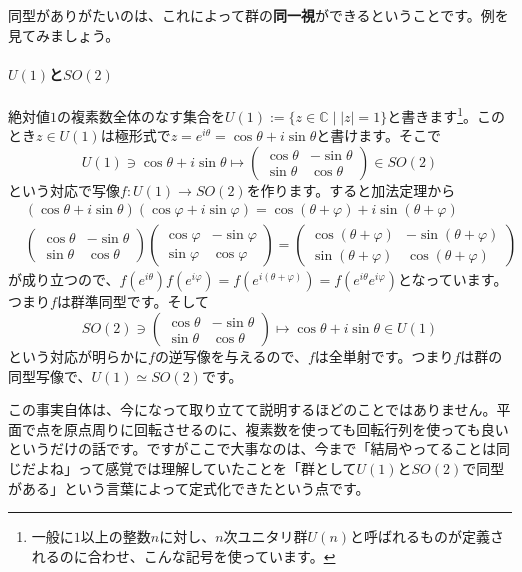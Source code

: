 同型がありがたいのは、これによって群の\textbf{同一視}ができるということです。例を見てみましょう。

\paragraph{$U(1)$と$SO(2)$} 絶対値$1$の複素数全体のなす集合を$U(1) := \{ z \in \mathbb{C} \mid |z| = 1 \} $と書きます\footnote{一般に$1$以上の整数$n$に対し、$n$次ユニタリ群$U(n)$と呼ばれるものが定義されるのに合わせ、こんな記号を使っています。}。このとき$z \in U(1)$は極形式で$z = e^{i\theta} = \cos\theta + i \sin\theta$と書けます。そこで
\[
U(1) \ni \cos\theta + i \sin\theta \mapsto
\begin{pmatrix}
\cos\theta & -\sin\theta \\
\sin\theta & \cos\theta
\end{pmatrix}
\in SO(2)
\]
という対応で写像$f \colon U(1) \rightarrow SO(2)$を作ります。すると加法定理から
\begin{align*}
&(\cos\theta + i \sin\theta)(\cos\varphi + i \sin\varphi)
= \cos(\theta + \varphi) + i \sin(\theta + \varphi) \\
&\begin{pmatrix}
\cos\theta & -\sin\theta \\
\sin\theta & \cos\theta
\end{pmatrix}
\begin{pmatrix}
\cos\varphi & -\sin\varphi \\
\sin\varphi & \cos\varphi
\end{pmatrix}
=
\begin{pmatrix}
\cos(\theta + \varphi) & -\sin(\theta + \varphi) \\
\sin(\theta + \varphi) & \cos(\theta + \varphi)
\end{pmatrix}
\end{align*}
が成り立つので、$f(e^{i\theta}) f(e^{i\varphi}) = f(e^{i(\theta + \varphi)}) = f(e^{i\theta} e^{i\varphi})$となっています。つまり$f$は群準同型です。そして
\[
SO(2) \ni
\begin{pmatrix}
\cos\theta & -\sin\theta \\
\sin\theta & \cos\theta
\end{pmatrix}
\mapsto
\cos\theta + i \sin\theta
\in U(1)
\]
という対応が明らかに$f$の逆写像を与えるので、$f$は全単射です。つまり$f$は群の同型写像で、$U(1) \simeq SO(2)$です。

この事実自体は、今になって取り立てて説明するほどのことではありません。平面で点を原点周りに回転させるのに、複素数を使っても回転行列を使っても良いというだけの話です。ですがここで大事なのは、今まで「結局やってることは同じだよね」って感覚では理解していたことを「群として$U(1)$と$SO(2)$で同型がある」という言葉によって定式化できたという点です。

